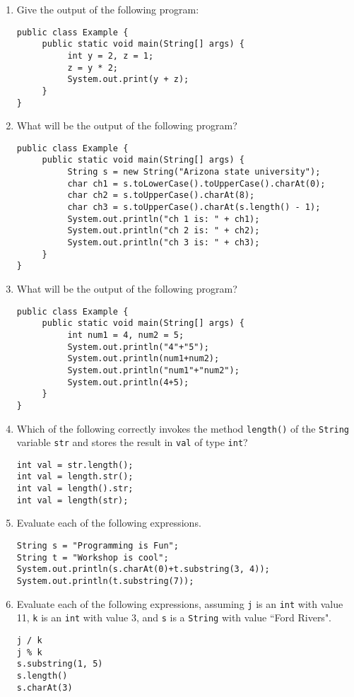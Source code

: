 \begin{enumerate}
\item Give the output of the following program:
\begin{lstlisting}
public class Example {
     public static void main(String[] args) {
          int y = 2, z = 1;
          z = y * 2;
          System.out.print(y + z);
     }
}
\end{lstlisting}

\item What will be the output of the following program?
\begin{lstlisting}
public class Example {
     public static void main(String[] args) {
          String s = new String("Arizona state university");
          char ch1 = s.toLowerCase().toUpperCase().charAt(0);
          char ch2 = s.toUpperCase().charAt(8);
          char ch3 = s.toUpperCase().charAt(s.length() - 1);
          System.out.println("ch 1 is: " + ch1);
          System.out.println("ch 2 is: " + ch2);
          System.out.println("ch 3 is: " + ch3);
     }
}
\end{lstlisting}

\item What will be the output of the following program?
\begin{lstlisting}
public class Example {
     public static void main(String[] args) {
          int num1 = 4, num2 = 5;
          System.out.println("4"+"5");
          System.out.println(num1+num2);
          System.out.println("num1"+"num2");
          System.out.println(4+5);
     }
}
\end{lstlisting}

\item Which of the following correctly invokes the method \verb|length()| of the \verb|String| variable \verb|str| and stores the result in \verb|val| of type \verb|int|?
\begin{lstlisting}
int val = str.length();
int val = length.str();
int val = length().str;
int val = length(str);
\end{lstlisting}

\item Evaluate each of the following expressions.
\begin{lstlisting}
String s = "Programming is Fun";
String t = "Workshop is cool";
System.out.println(s.charAt(0)+t.substring(3, 4));
System.out.println(t.substring(7));
\end{lstlisting}

\item Evaluate each of the following expressions, assuming \verb|j| is an \verb|int| with value 11, \verb|k| is an \verb|int| with value 3, and \verb|s| is a \verb|String| with value ``Ford Rivers".
\begin{lstlisting}
j / k
j % k
s.substring(1, 5)
s.length()
s.charAt(3)
\end{lstlisting}


\end{enumerate}
